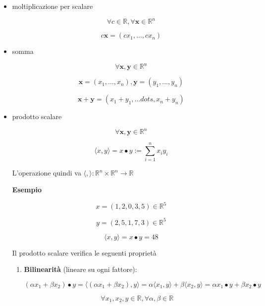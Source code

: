 \documentclass[../appunti-analisi.tex]{subfiles}
\begin{document}
\begin{itemize}
    \item moltiplicazione per scalare

        \[
            \forall c \in \mathbb{R}, \forall \textbf{x} \in \mathbb{R}^{n}
        \]

        \[
            c \textbf{x} = (cx_1, \ldots ,cx_n)
        \]

    \item somma

        \[
            \forall \textbf{x}, \textbf{y}  \in \mathbb{R}^{n}
        \]

        \[
       \textbf{x}  =(x_1, \ldots ,x_n), \textbf{y}  = (y_1, \ldots ,y_n)
        \]

        \[
            \textbf{x}+ \textbf{y} = (x_1+y_1, \ldots dots ,x_n+y_n)
        \]

    \item prodotto scalare

        \[
            \forall \textbf{x} ,\textbf{y} \in \mathbb{R}^{n}
        \]

        \[
            \langle x,y \rangle  = x \bullet y := \sum^{n}_{i=1} x_i y_i
        \]

        L'operazione quindi va $\langle , \rangle : \mathbb{R}^{n} \times \mathbb{R}^{n} \rightarrow \mathbb{R}$

        \textbf{Esempio} 

        \[
            x=(1,2,0,3,5) \in \mathbb{R}^{5}
        \]

        \[
            y=(2,5,1,7,3) \in \mathbb{R}^{5}
        \]

        \[
            \langle x,y \rangle  = x \bullet y = 48
        \]

        Il prodotto scalare verifica le seguenti proprietà

        \begin{enumerate}
            \item \textbf{Bilinearità} (lineare su ogni fattore):

                \[
                    (\alpha x_1 + \beta x_2) \bullet y = \langle (\alpha x_1 + \beta x_2), y \rangle  = \alpha \langle x_1,y \rangle+ \beta \langle x_2,y \rangle = \alpha x_1 \bullet y + \beta x_2 \bullet y
                \]

                \[
                    \forall x_1,x_2,y \in \mathbb{R}, \forall \alpha, \beta \in \mathbb{R}
                \]


\end{enumerate}
\end{itemize}
\end{document}
